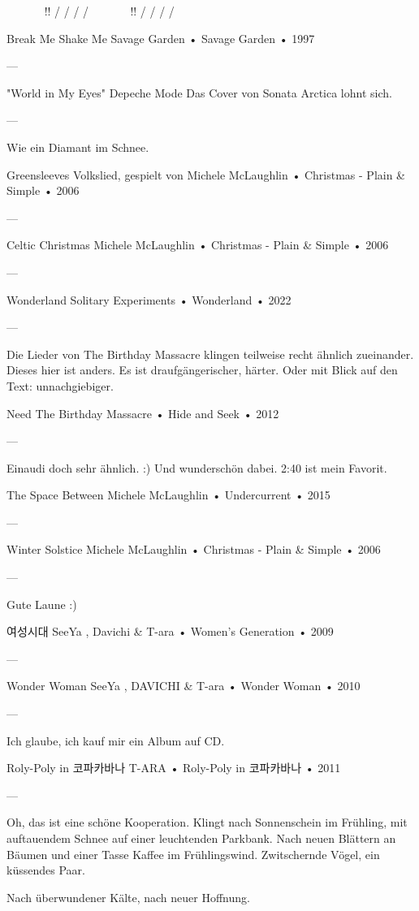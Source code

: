 ~ ~ ~ ~ !! / / / / ~ ~ ~ ~ !! / / / /

Break Me Shake Me
Savage Garden
 •
Savage Garden
 • 1997

—

"World in My Eyes"
Depeche Mode
Das Cover von Sonata Arctica lohnt sich.

—

Wie ein Diamant im Schnee.

Greensleeves
Volkslied, gespielt von
Michele McLaughlin
 •
Christmas - Plain & Simple
 •
2006

—

Celtic Christmas
Michele McLaughlin
 •
Christmas - Plain & Simple
 •
2006

—

Wonderland
Solitary Experiments
 •
Wonderland
 •
2022

—

Die Lieder von The Birthday Massacre klingen teilweise recht ähnlich zueinander.
Dieses hier ist anders. Es ist draufgängerischer, härter. Oder mit Blick auf den Text: unnachgiebiger.

Need
The Birthday Massacre
 •
Hide and Seek
 •
2012

—

Einaudi doch sehr ähnlich. :)
Und wunderschön dabei. 2:40 ist mein Favorit.

The Space Between
Michele McLaughlin
 •
Undercurrent
 •
2015

—

Winter Solstice
Michele McLaughlin
 •
Christmas - Plain & Simple
 •
2006

—

Gute Laune :)

여성시대
SeeYa
,
Davichi
 &
T-ara
 •
Women's Generation
 •
2009

—

Wonder Woman
SeeYa
,
DAVICHI
 &
T-ara
 •
Wonder Woman
 •
2010

—

Ich glaube, ich kauf mir ein Album auf CD.

Roly-Poly in 코파카바나
T-ARA
 •
Roly-Poly in 코파카바나
 •
2011


—

Oh, das ist eine schöne Kooperation. Klingt nach Sonnenschein im Frühling, mit auftauendem Schnee auf einer leuchtenden Parkbank. Nach neuen Blättern an Bäumen und einer Tasse Kaffee im Frühlingswind. Zwitschernde Vögel, ein küssendes Paar.

Nach überwundener Kälte, nach neuer Hoffnung.


